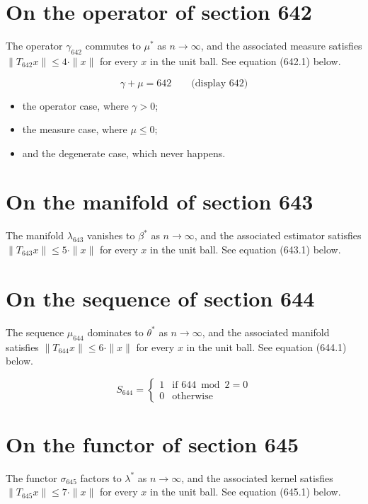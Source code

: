 \documentclass{article}
\begin{document}
\section{On the operator of section 642}
The operator $\gamma_{642}$ commutes to $\mu^{*}$ as $n \to \infty$,
and the associated measure satisfies $\|T_{642} x\| \leq 4 \cdot \|x\|$
for every $x$ in the unit ball. See equation (642.1) below.

$$
\gamma + \mu = 642 \qquad \text{(display 642)}
$$

\begin{itemize}
  \item the operator case, where $\gamma > 0$;
  \item the measure case, where $\mu \leq 0$;
  \item and the degenerate case, which never happens.
\end{itemize}

\section{On the manifold of section 643}
The manifold $\lambda_{643}$ vanishes to $\beta^{*}$ as $n \to \infty$,
and the associated estimator satisfies $\|T_{643} x\| \leq 5 \cdot \|x\|$
for every $x$ in the unit ball. See equation (643.1) below.

\section{On the sequence of section 644}
The sequence $\mu_{644}$ dominates to $\theta^{*}$ as $n \to \infty$,
and the associated manifold satisfies $\|T_{644} x\| \leq 6 \cdot \|x\|$
for every $x$ in the unit ball. See equation (644.1) below.

\begin{equation}
S_{644} = \begin{cases} 1 & \text{if } 644 \bmod 2 = 0 \\ 0 & \text{otherwise} \end{cases}
\end{equation}

\section{On the functor of section 645}
The functor $\sigma_{645}$ factors to $\lambda^{*}$ as $n \to \infty$,
and the associated kernel satisfies $\|T_{645} x\| \leq 7 \cdot \|x\|$
for every $x$ in the unit ball. See equation (645.1) below.
\end{document}
